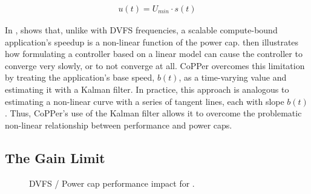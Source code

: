\begin{eqnarray}
  u(t) = U_{min} \cdot s(t)
  \label{eqn:new-powercap}
\end{eqnarray}

In ,  shows that, unlike with DVFS frequencies, a scalable compute-bound application's speedup is a non-linear function of the power cap.
 then illustrates how formulating a controller based on a linear model can cause the controller to converge very slowly, or to not converge at all.
CoPPer overcomes this limitation by treating the application's base speed, $b(t)$, as a time-varying value and estimating it with a Kalman filter.
In practice, this approach is analogous to estimating a non-linear curve with a series of tangent lines, each with slope $b(t)$.
Thus, CoPPer's use of the Kalman filter allows it to overcome the problematic non-linear relationship between performance and power caps.


\subsection{The Gain Limit}
\label{sec:copper-framework-gain}

\begin{figure}[t]
  \centering
  \subfloat[DVFS]%
  {%
  \label{fig:copper-tradeoffs-hop-dvfs}}
  \caption{DVFS / Power cap performance impact for .}
  \label{fig:copper-tradeoffs-hop}
\end{figure}

